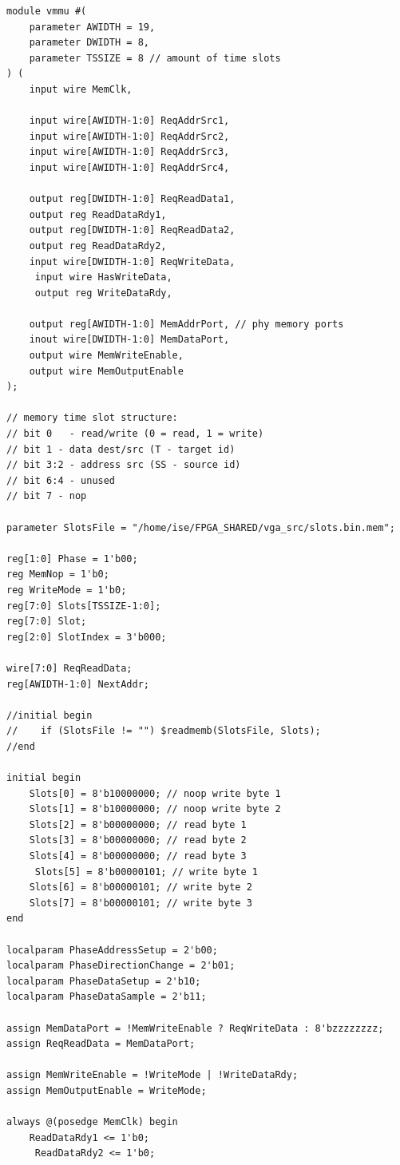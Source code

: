 \documentclass[12pt, a4paper]{article}
\begin{document}
\begin{lstlisting}[style=prettyverilog,caption={Moduł vmmu.v}]
module vmmu #(
    parameter AWIDTH = 19,
    parameter DWIDTH = 8,
    parameter TSSIZE = 8 // amount of time slots
) (
    input wire MemClk,

    input wire[AWIDTH-1:0] ReqAddrSrc1,
    input wire[AWIDTH-1:0] ReqAddrSrc2,
    input wire[AWIDTH-1:0] ReqAddrSrc3,
    input wire[AWIDTH-1:0] ReqAddrSrc4,

    output reg[DWIDTH-1:0] ReqReadData1,
    output reg ReadDataRdy1,
    output reg[DWIDTH-1:0] ReqReadData2,
    output reg ReadDataRdy2,
    input wire[DWIDTH-1:0] ReqWriteData,
	 input wire HasWriteData,
	 output reg WriteDataRdy,

    output reg[AWIDTH-1:0] MemAddrPort, // phy memory ports
    inout wire[DWIDTH-1:0] MemDataPort,
    output wire MemWriteEnable,
    output wire MemOutputEnable
);

// memory time slot structure:
// bit 0   - read/write (0 = read, 1 = write)
// bit 1 - data dest/src (T - target id)
// bit 3:2 - address src (SS - source id)
// bit 6:4 - unused
// bit 7 - nop

parameter SlotsFile = "/home/ise/FPGA_SHARED/vga_src/slots.bin.mem";

reg[1:0] Phase = 1'b00;
reg MemNop = 1'b0;
reg WriteMode = 1'b0;
reg[7:0] Slots[TSSIZE-1:0];
reg[7:0] Slot;
reg[2:0] SlotIndex = 3'b000;

wire[7:0] ReqReadData;
reg[AWIDTH-1:0] NextAddr;

//initial begin
//    if (SlotsFile != "") $readmemb(SlotsFile, Slots);
//end

initial begin
    Slots[0] = 8'b10000000; // noop write byte 1
    Slots[1] = 8'b10000000; // noop write byte 2
    Slots[2] = 8'b00000000; // read byte 1
    Slots[3] = 8'b00000000; // read byte 2
    Slots[4] = 8'b00000000; // read byte 3
	 Slots[5] = 8'b00000101; // write byte 1
    Slots[6] = 8'b00000101; // write byte 2
    Slots[7] = 8'b00000101; // write byte 3
end

localparam PhaseAddressSetup = 2'b00;
localparam PhaseDirectionChange = 2'b01;
localparam PhaseDataSetup = 2'b10;
localparam PhaseDataSample = 2'b11;

assign MemDataPort = !MemWriteEnable ? ReqWriteData : 8'bzzzzzzzz;
assign ReqReadData = MemDataPort;

assign MemWriteEnable = !WriteMode | !WriteDataRdy;
assign MemOutputEnable = WriteMode;

always @(posedge MemClk) begin
    ReadDataRdy1 <= 1'b0;
	 ReadDataRdy2 <= 1'b0;
	 

\end{lstlisting}
\end{document}
